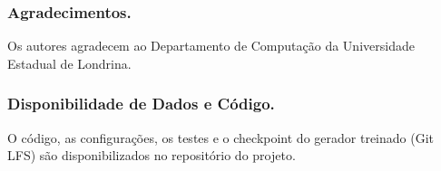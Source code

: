 \documentclass[runningheads]{llncs}
\begin{document}
\subsubsection*{Agradecimentos.} Os autores agradecem ao Departamento de
Computação da Universidade Estadual de Londrina.

\subsubsection*{Disponibilidade de Dados e Código.} O código, as configurações, os
testes e o checkpoint do gerador treinado (Git LFS) são disponibilizados no
repositório do projeto.



\end{document}
